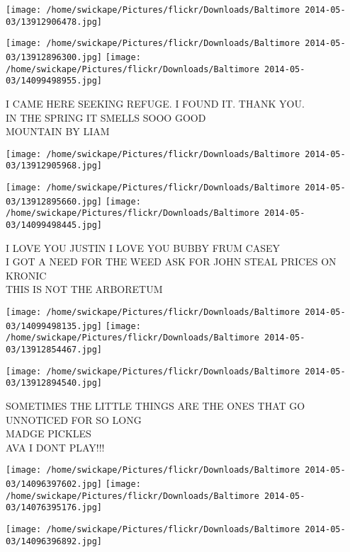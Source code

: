\documentclass[10pt,letterpaper]{article}
\begin{document}
\texttt{[image: /home/swickape/Pictures/flickr/Downloads/Baltimore 2014-05-03/13912906478.jpg]}

\vspace{0.25in}
\texttt{[image: /home/swickape/Pictures/flickr/Downloads/Baltimore 2014-05-03/13912896300.jpg]}
\texttt{[image: /home/swickape/Pictures/flickr/Downloads/Baltimore 2014-05-03/14099498955.jpg]}

I CAME HERE SEEKING REFUGE. I FOUND IT.  THANK YOU.\\
IN THE SPRING IT SMELLS SOOO GOOD\\
MOUNTAIN BY LIAM
\pagebreak

\texttt{[image: /home/swickape/Pictures/flickr/Downloads/Baltimore 2014-05-03/13912905968.jpg]}

\vspace{0.25in}
\texttt{[image: /home/swickape/Pictures/flickr/Downloads/Baltimore 2014-05-03/13912895660.jpg]}
\texttt{[image: /home/swickape/Pictures/flickr/Downloads/Baltimore 2014-05-03/14099498445.jpg]}

I LOVE YOU JUSTIN I LOVE YOU BUBBY FRUM CASEY\\
I GOT A NEED FOR THE WEED ASK FOR JOHN STEAL PRICES ON KRONIC\\
THIS IS NOT THE ARBORETUM
\pagebreak

\texttt{[image: /home/swickape/Pictures/flickr/Downloads/Baltimore 2014-05-03/14099498135.jpg]}
\texttt{[image: /home/swickape/Pictures/flickr/Downloads/Baltimore 2014-05-03/13912854467.jpg]}

\vspace{0.25in}
\texttt{[image: /home/swickape/Pictures/flickr/Downloads/Baltimore 2014-05-03/13912894540.jpg]}

SOMETIMES THE LITTLE THINGS ARE THE ONES THAT GO UNNOTICED FOR SO LONG\\
MADGE PICKLES\\
AVA I DONT PLAY!!!
\pagebreak

\texttt{[image: /home/swickape/Pictures/flickr/Downloads/Baltimore 2014-05-03/14096397602.jpg]}
\texttt{[image: /home/swickape/Pictures/flickr/Downloads/Baltimore 2014-05-03/14076395176.jpg]}

\vspace{0.25in}
\texttt{[image: /home/swickape/Pictures/flickr/Downloads/Baltimore 2014-05-03/14096396892.jpg]}
\end{document}
